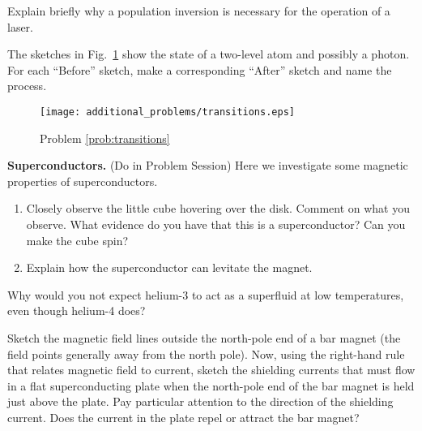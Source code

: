 \begin{problem}
  Explain briefly why a population inversion is necessary for the
  operation of a laser.
\end{problem}


\newpage

\begin{problem}
  The sketches in Fig.~\ref{fig:stim_emission} show the state of a two-level
  atom and possibly a photon.  For each ``Before'' sketch, make a
  corresponding ``After'' sketch and name the process.
  \label{prob:transitions}

  \begin{figure}[h]
    \begin{center}
      \texttt{[image: additional\_problems/transitions.eps]}
      \caption{Problem \ref{prob:transitions}}
      \label{fig:stim_emission}
    \end{center}
  \end{figure}
\end{problem}

\begin{problem}
  {\bf Superconductors.} (Do in Problem Session) Here we investigate
  some magnetic properties of superconductors.

  \begin{enumerate} 
  \item Closely observe the little cube hovering over the disk.
    Comment on what you observe.  What evidence do you have that this
    is a superconductor?  Can you make the cube spin?

  \item Explain how the superconductor can levitate the magnet.

  \end{enumerate}
\end{problem}


\begin{problem}
Why would you not expect helium-3 to act as a superfluid at low
  temperatures, even though helium-4 does?
\label{prob:he3_superfluid}
\end{problem}


\begin{problem}
  Sketch the magnetic field lines outside the north-pole end of a bar
  magnet (the field points generally away from the north pole).  Now,
  using the right-hand rule that relates magnetic field to current,
  sketch the shielding currents that must flow in a flat
  superconducting plate when the north-pole end of the bar magnet is
  held just above the plate.  Pay particular attention to the
  direction of the shielding current.  Does the current in the plate
  repel or attract the bar magnet?
\label{prob:barmagnet}
\end{problem}


